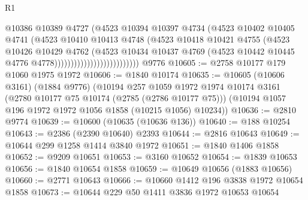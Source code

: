 \begin{lexlean}{R1}
\begin{coremodule}
                                          @10386
                                          @10389
                                          @4727
                                          (@4523
                                            @10394
                                            @10397
                                            @4734
                                            (@4523
                                              @10402
                                              @10405
                                              @4741
                                              (@4523
                                                @10410
                                                @10413
                                                @4748
                                                (@4523
                                                  @10418
                                                  @10421
                                                  @4755
                                                  (@4523
                                                    @10426
                                                    @10429
                                                    @4762
                                                    (@4523
                                                      @10434
                                                      @10437
                                                      @4769
                                                      (@4523
                                                        @10442
                                                        @10445
                                                        @4776
                                                        @4778))))))))))))))))))))))))))
    @9776
@10605 := @2758 @10177 @179 @1060 @1975 @1972
@10606 := @1840 @10174
@10635 := @10605
    (@10606 @3161)
    (@1884 @9776)
    (@10194
      @257
      @1059
      @1972
      @1974
      @10174
      @3161
      (@2780 @10177 @75 @10174 (@2785 (@2786 @10177 @75)))
      (@10194 @1057 @196 @1972 @1972 @1056 @1858 (@10215 @1056) @10234))
@10636 := @2810 @9774
@10639 := @10600 (@10635 (@10636 @136))
@10640 := @188 @10254
@10643 := @2386 (@2390 @10640) @2393
@10644 := @2816 @10643
@10649 := @10644 @299 @1258 @1414 @3840 @1972
@10651 := @1840 @1406 @1858
@10652 := @9209 @10651
@10653 := @3160 @10652
@10654 := @1839 @10653
@10656 := @1840 @10654 @1858
@10659 := @10649 @10656 (@1883 @10656)
@10660 := @2771 @10643
@10666 := @10660 @1412 @196 @3838 @1972 @10654 @1858
@10673 := @10644 @229 @50 @1411 @3836 @1972 @10653 @10654

\end{coremodule}
\end{lexlean}
